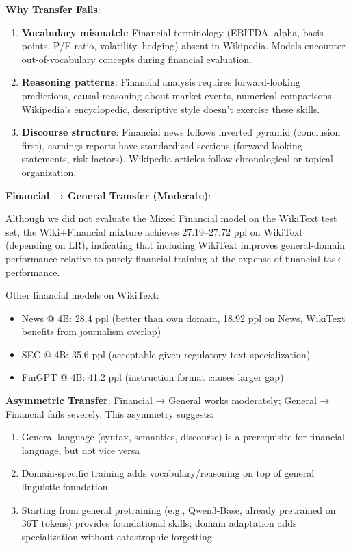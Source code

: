 \textbf{Why Transfer Fails}:
\begin{enumerate}
\item \textbf{Vocabulary mismatch}: Financial terminology (EBITDA, alpha, basis points, P/E ratio, volatility, hedging) absent in Wikipedia. Models encounter out-of-vocabulary concepts during financial evaluation.
\item \textbf{Reasoning patterns}: Financial analysis requires forward-looking predictions, causal reasoning about market events, numerical comparisons. Wikipedia's encyclopedic, descriptive style doesn't exercise these skills.
\item \textbf{Discourse structure}: Financial news follows inverted pyramid (conclusion first), earnings reports have standardized sections (forward-looking statements, risk factors). Wikipedia articles follow chronological or topical organization.
\end{enumerate}

\textbf{Financial → General Transfer (Moderate)}:

Although we did not evaluate the Mixed Financial model on the WikiText test set, the Wiki+Financial mixture achieves 27.19–27.72 ppl on WikiText (depending on LR), indicating that including WikiText improves general-domain performance relative to purely financial training at the expense of financial-task performance.

Other financial models on WikiText:
\begin{itemize}
\item News @ 4B: 28.4 ppl (better than own domain, 18.92 ppl on News, WikiText benefits from journalism overlap)
\item SEC @ 4B: 35.6 ppl (acceptable given regulatory text specialization)
\item FinGPT @ 4B: 41.2 ppl (instruction format causes larger gap)
\end{itemize}

\textbf{Asymmetric Transfer}: Financial → General works moderately; General → Financial fails severely. This asymmetry suggests:
\begin{enumerate}
\item General language (syntax, semantics, discourse) is a prerequisite for financial language, but not vice versa
\item Domain-specific training adds vocabulary/reasoning on top of general linguistic foundation
\item Starting from general pretraining (e.g., Qwen3-Base, already pretrained on 36T tokens) provides foundational skills; domain adaptation adds specialization without catastrophic forgetting
\end{enumerate}

